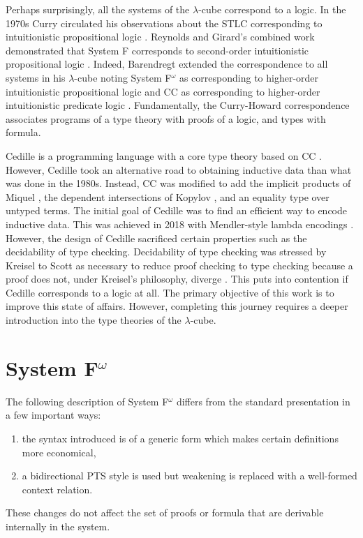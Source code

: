 Perhaps surprisingly, all the systems of the $\lambda$-cube correspond to a logic.
In the 1970s Curry circulated his observations about the STLC corresponding to intuitionistic propositional logic \cite{howard1980}.
Reynolds and Girard's combined work demonstrated that System F corresponds to second-order intuitionistic propositional logic \cite{girard1972,reynolds1974_systemf,reynolds1983}.
Indeed, Barendregt extended the correspondence to all systems in his $\lambda$-cube noting System F$^\omega$ as corresponding to higher-order intuitionistic propositional logic and CC as corresponding to higher-order intuitionistic predicate logic \cite{barendregt1991_pts}.
Fundamentally, the Curry-Howard correspondence associates programs of a type theory with proofs of a logic, and types with formula.

Cedille is a programming language with a core type theory based on CC \cite{stump2017_cdle,stump2021_cedillecore}.
However, Cedille took an alternative road to obtaining inductive data than what was done in the 1980s.
Instead, CC was modified to add the implicit products of Miquel \cite{miquel2001}, the dependent intersections of Kopylov \cite{kopylov2003}, and an equality type over untyped terms.
The initial goal of Cedille was to find an efficient way to encode inductive data.
This was achieved in 2018 with Mendler-style lambda encodings \cite{firsov2018_mendler}. 
However, the design of Cedille sacrificed certain properties such as the decidability of type checking.
Decidability of type checking was stressed by Kreisel to Scott as necessary to reduce proof checking to type checking because a proof does not, under Kreisel's philosophy, diverge \cite{scott1970}.
This puts into contention if Cedille corresponds to a logic at all.
The primary objective of this work is to improve this state of affairs.
However, completing this journey requires a deeper introduction into the type theories of the $\lambda$-cube.

\section{System \texorpdfstring{F$^\omega$}{F Omega}}

The following description of System F$^\omega$ differs from the standard presentation in a few important ways:
\begin{enumerate}
    \item the syntax introduced is of a generic form which makes certain definitions more economical,
    \item a bidirectional PTS style is used but weakening is replaced with a well-formed context relation.
\end{enumerate}
These changes do not affect the set of proofs or formula that are derivable internally in the system.


